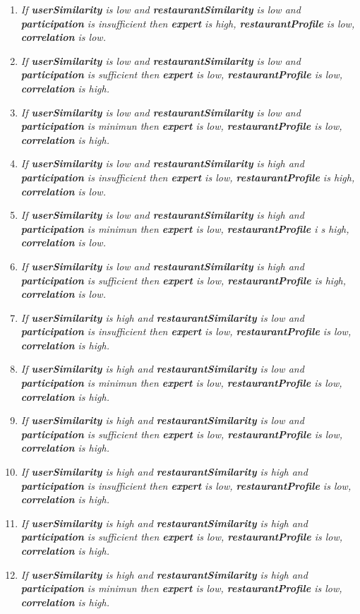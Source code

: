 \begin{enumerate} 
\item \textit{If \textbf{userSimilarity} is low and 
\textbf{restaurantSimilarity} is low and \textbf{participation} 
is insufficient then \textbf{expert} is high, \textbf{restaurantProfile} 
is low, \textbf{correlation} is low.}
\item \textit{If \textbf{userSimilarity} is low and 
\textbf{restaurantSimilarity} is low and \textbf{participation} 
is sufficient then \textbf{expert} is low, \textbf{restaurantProfile} 
is low, \textbf{correlation} is high.}
\item \textit{If \textbf{userSimilarity} is low and 
\textbf{restaurantSimilarity} is low and \textbf{participation} 
is minimun then \textbf{expert} is low, \textbf{restaurantProfile} 
is low, \textbf{correlation} is high.}
\item \textit{If \textbf{userSimilarity} is low and 
\textbf{restaurantSimilarity} is high and \textbf{participation} 
is insufficient then \textbf{expert} is low, \textbf{restaurantProfile} 
is high, \textbf{correlation} is low.}
\item \textit{If \textbf{userSimilarity} is low and 
\textbf{restaurantSimilarity} is high and \textbf{participation} 
is minimun then \textbf{expert} is low, \textbf{restaurantProfile} i
s high, \textbf{correlation} is low.}
\item \textit{If \textbf{userSimilarity} is low and 
\textbf{restaurantSimilarity} is high and \textbf{participation} 
is sufficient then \textbf{expert} is low, \textbf{restaurantProfile} 
is high, \textbf{correlation} is low.}
\item \textit{If \textbf{userSimilarity} is high and 
\textbf{restaurantSimilarity} is low and \textbf{participation} 
is insufficient then \textbf{expert} is low, \textbf{restaurantProfile} 
is low, \textbf{correlation} is high.}
\item \textit{If \textbf{userSimilarity} is high and 
\textbf{restaurantSimilarity} is low and \textbf{participation} 
is minimun then \textbf{expert} is low, \textbf{restaurantProfile} 
is low, \textbf{correlation} is high.}
\item \textit{If \textbf{userSimilarity} is high and 
\textbf{restaurantSimilarity} is low and \textbf{participation} 
is sufficient then \textbf{expert} is low, \textbf{restaurantProfile} 
is low, \textbf{correlation} is high.}
\item \textit{If \textbf{userSimilarity} is high and 
\textbf{restaurantSimilarity} is high and \textbf{participation} 
is insufficient then \textbf{expert} is low, \textbf{restaurantProfile} 
is low, \textbf{correlation} is high.}
\item \textit{If \textbf{userSimilarity} is high and 
\textbf{restaurantSimilarity} is high and \textbf{participation} 
is sufficient then \textbf{expert} is low, \textbf{restaurantProfile} 
is low, \textbf{correlation} is high.}
\item \textit{If \textbf{userSimilarity} is high and 
\textbf{restaurantSimilarity} is high and \textbf{participation} 
is minimun then \textbf{expert} is low, \textbf{restaurantProfile} 
is low, \textbf{correlation} is high.}
\end{enumerate} 

